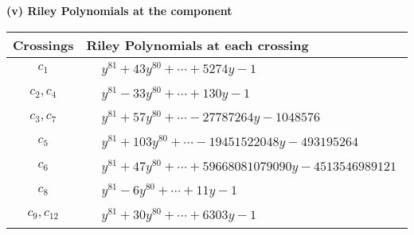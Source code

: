 \documentclass[1p]{elsarticle_modified}
\theoremstyle{definition}
\begin{document}
\newpage\renewcommand{\arraystretch}{1}
\flushleft \textbf{(v) Riley Polynomials at the component}\newline \\
\begin{tabular}{m{50pt}|m{274pt}}
Crossings & \hspace{64pt}Riley Polynomials at each crossing \\
\hline $$\begin{aligned}c_{1}\end{aligned}$$&$\begin{aligned}
&y^{81}+43 y^{80}+\cdots+5274 y-1
\end{aligned}$\\
\hline $$\begin{aligned}c_{2},c_{4}\end{aligned}$$&$\begin{aligned}
&y^{81}-33 y^{80}+\cdots+130 y-1
\end{aligned}$\\
\hline $$\begin{aligned}c_{3},c_{7}\end{aligned}$$&$\begin{aligned}
&y^{81}+57 y^{80}+\cdots-27787264 y-1048576
\end{aligned}$\\
\hline $$\begin{aligned}c_{5}\end{aligned}$$&$\begin{aligned}
&y^{81}+103 y^{80}+\cdots-19451522048 y-493195264
\end{aligned}$\\
\hline $$\begin{aligned}c_{6}\end{aligned}$$&$\begin{aligned}
&y^{81}+47 y^{80}+\cdots+59668081079090 y-4513546989121
\end{aligned}$\\
\hline $$\begin{aligned}c_{8}\end{aligned}$$&$\begin{aligned}
&y^{81}-6 y^{80}+\cdots+11 y-1
\end{aligned}$\\
\hline $$\begin{aligned}c_{9},c_{12}\end{aligned}$$&$\begin{aligned}
&y^{81}+30 y^{80}+\cdots+6303 y-1
\end{aligned}$\\

\end{tabular}
\end{document}

